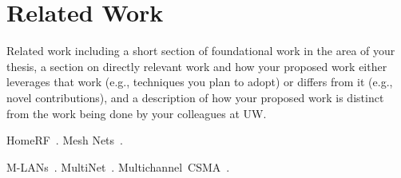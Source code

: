 \section{Related Work}
Related work including a short section of foundational work in the
area of your thesis, a section on directly relevant work and how your
proposed work either leverages that work (e.g., techniques you plan to
adopt) or differs from it (e.g., novel contributions), and a description
of how your proposed work is distinct from the work being done by your
colleagues at UW.

HomeRF~\cite{nagus_homerf}. Mesh Nets~\cite{whitehead_mesh}.

M-LANs~\cite{marsan_multichan}. MultiNet~\cite{chandra_multinet}. Multichannel~CSMA~\cite{nasipuri_multichan}.